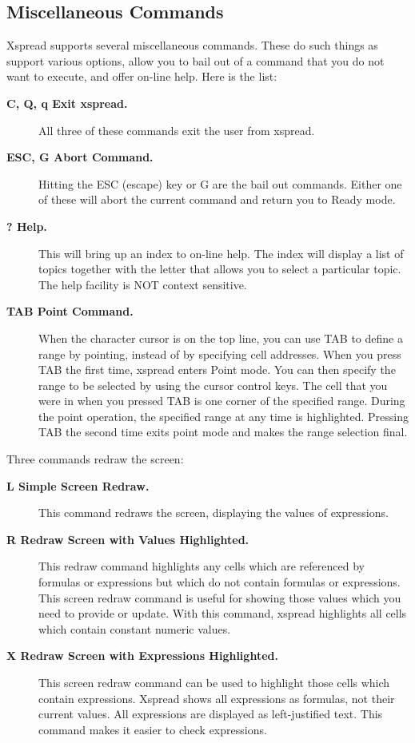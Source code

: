 \subsection*{Miscellaneous Commands}

    Xspread supports several miscellaneous commands.  These do such things as 
support various options, allow you to bail out of a command that you do not 
want to execute, and offer on-line help.  Here is the list:
\begin{description}
\item[{\bf \ctrl C, Q, q  Exit xspread.}]{  All three of these commands exit the user from
       xspread.}

\item[{\bf  ESC, \ctrl G  Abort Command.}]{  Hitting the ESC (escape) key
    or \ctrl G are the bail out
    commands.  Either one of these will abort the current command and 
    return you to Ready mode.}

\item[{\bf ?   Help.}]{  This will bring up an index to on-line help.  The index will
display a list of topics together with the letter that allows you to 
select a particular topic.  The help facility is NOT context 
sensitive.}

\item[{\bf TAB Point Command.}]{  When the character cursor is on the top line, you can
use TAB to define a range by pointing, instead of by specifying cell 
addresses.  When you press TAB the first time, xspread enters Point 
mode.  You can then specify the range to be selected by using the 
cursor control keys.  The cell that you were in when you pressed TAB 
is one corner of the specified range.  During the point operation, the 
specified range at any time is highlighted.  Pressing TAB the second 
time exits point mode and makes the range selection final.}
\end{description}

Three commands redraw the screen:
\begin{description}
\item[{\bf \ctrl L  Simple Screen Redraw.}]{  This command redraws the screen, 
displaying the
values of expressions.}

\item[{\bf \ctrl R  Redraw Screen with Values Highlighted.}]{  This redraw 
command
highlights any cells which are referenced by formulas or expressions 
but which do not contain formulas or expressions.  This screen redraw 
command is useful for showing those values which you need to provide 
or update.  With this command, xspread highlights all cells which 
contain constant numeric values.} 

\item[{\bf \ctrl X  Redraw Screen with Expressions Highlighted.}]{This
screen redraw
command can be used to highlight those cells which contain expressions.
Xspread shows all expressions as formulas, not their current values.  All 
expressions are displayed as left-justified text.  This command makes 
it easier to check expressions.}
\end{description}

